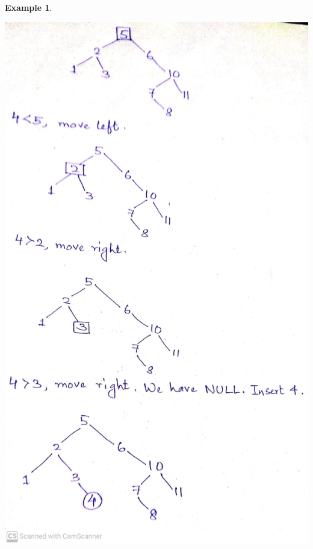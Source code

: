 \documentclass[10pt, a4paper]{extarticle}
\theoremstyle{definition}
\newtheorem{eg}{Example}
\begin{document}
\begin{eg}
\begin{center}
		\includegraphics[scale=0.16]{bst3.jpg}\\
	\end{center}
\end{eg}
\end{document}

